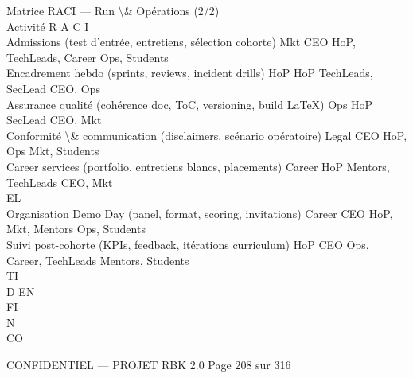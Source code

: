 \documentclass[12pt,landscape,a4paper]{article}
\newenvironment{confidential}
{\begin{tcolorbox}[
    colback=rbkred!5!white,
    colframe=rbkred!75!black,
    title=CONFIDENTIEL,
    fonttitle=\bfseries\color{white},
    coltitle=rbkred!75!black,
    breakable,
    enhanced,
    frame hidden,
    borderline west={2pt}{0pt}{rbkred!75!black}
]}
{\end{tcolorbox}}
\begin{document}
\vspace{0.5em}
\vspace{0.5em}
Matrice RACI — Run \textbackslash{}& Opérations (2/2)\\
\vspace{0.5em}
\vspace{0.5em}
Activité                                                            R      A    C                        I\\
Admissions (test d’entrée, entretiens, sélection cohorte)           Mkt    CEO HoP, TechLeads, Career Ops, Students\\
Encadrement hebdo (sprints, reviews, incident drills)               HoP    HoP TechLeads, SecLead        CEO, Ops\\
Assurance qualité (cohérence doc, ToC, versioning, build LaTeX) Ops        HoP SecLead                   CEO, Mkt\\
Conformité \textbackslash{}& communication (disclaimers, scénario opératoire) Legal        CEO HoP, Ops                  Mkt, Students\\
Career services (portfolio, entretiens blancs, placements)          Career HoP Mentors, TechLeads        CEO, Mkt\\
\vspace{0.5em}
\vspace{0.5em}
\vspace{0.5em}
\vspace{0.5em}
EL\\
Organisation Demo Day (panel, format, scoring, invitations)         Career CEO HoP, Mkt, Mentors         Ops, Students\\
Suivi post-cohorte (KPIs, feedback, itérations curriculum)          HoP    CEO Ops, Career, TechLeads Mentors, Students\\
\vspace{0.5em}
\vspace{0.5em}
\vspace{0.5em}
\vspace{0.5em}
TI\\
D    EN\\
FI\\
N\\
CO\\
\vspace{0.5em}
\vspace{0.5em}
\vspace{0.5em}
\vspace{0.5em}
\begin{confidential}CONFIDENTIEL — PROJET RBK 2.0                                  Page 208 sur 316\end{confidential}
\end{document}
